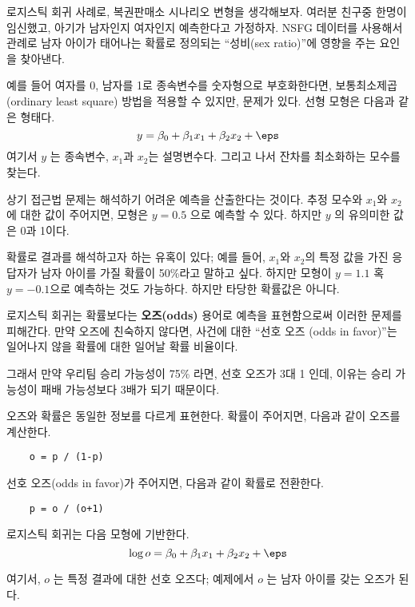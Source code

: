 로지스틱 회귀 사례로, 복권판매소 시나리오 변형을 생각해보자.
여러분 친구중 한명이 임신했고, 아기가 남자인지 여자인지 예측한다고 가정하자. NSFG 데이터를 사용해서 관례로 남자 아이가 태어나는 확률로 정의되는 ``성비(sex ratio)''에 영향을 주는 요인을 찾아낸다.

예를 들어 여자를 0, 남자를 1로 종속변수를 숫자형으로 부호화한다면, 보통최소제곱(ordinary least square) 방법을 적용할 수 있지만, 문제가 있다.
선형 모형은 다음과 같은 형태다.
%
\[ y = \beta_0 + \beta_1 x_1 + \beta_2 x_2 + \eps \]
%
여기서 $y$ 는 종속변수, $x_1$과 $x_2$는 설명변수다.
그리고 나서 잔차를 최소화하는 모수를 찾는다.

상기 접근법 문제는 해석하기 어려운 예측을 산출한다는 것이다.
추정 모수와 $x_1$와 $x_2$에 대한 값이 주어지면, 모형은 $y=0.5$ 으로 예측할 수 있다. 하지만 $y$ 의 유의미한 값은 0과 1이다.

확률로 결과를 해석하고자 하는 유혹이 있다; 예를 들어, $x_1$와 $x_2$의 특정 값을 가진 응답자가 남자 아이를 가질 확률이 50\%라고 말하고 싶다. 하지만 모형이 $y=1.1$ 혹 $y=-0.1$으로 예측하는 것도 가능하다. 하지만 타당한 확률값은 아니다.

로지스틱 회귀는 확률보다는 {\bf 오즈(odds)} 용어로 예측을 표현함으로써 이러한 문제를 피해간다. 만약 오즈에 친숙하지 않다면, 사건에 대한 ``선호 오즈 (odds in favor)''는 일어나지 않을 확률에 대한 일어날 확률 비율이다.

그래서 만약 우리팀 승리 가능성이 75\% 라면, 선호 오즈가 3대 1 인데, 이유는 승리 가능성이 패배 가능성보다 3배가 되기 때문이다.

오즈와 확률은 동일한 정보를 다르게 표현한다.
확률이 주어지면, 다음과 같이 오즈를 계산한다.

\begin{verbatim}
    o = p / (1-p)
\end{verbatim}

선호 오즈(odds in favor)가 주어지면, 다음과 같이 확률로 전환한다.

\begin{verbatim}
    p = o / (o+1)
\end{verbatim}

로지스틱 회귀는 다음 모형에 기반한다.
%
\[ \log o = \beta_0 + \beta_1 x_1 + \beta_2 x_2 + \eps \]
%

여기서, $o$ 는 특정 결과에 대한 선호 오즈다; 예제에서 $o$ 는 남자 아이를 갖는 오즈가 된다.

